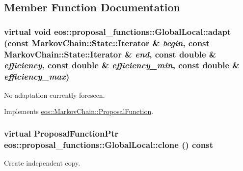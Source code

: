 \subsection{Member Function Documentation}
\hypertarget{classeos_1_1proposal__functions_1_1GlobalLocal_aecea521f102e4f3c2fd0fad24b21b730}{
\subsubsection[{adapt}]{\setlength{\rightskip}{0pt plus 5cm}virtual void eos::proposal\_\-functions::GlobalLocal::adapt (const {\bf MarkovChain::State::Iterator} \& {\em begin}, \/  const {\bf MarkovChain::State::Iterator} \& {\em end}, \/  const double \& {\em efficiency}, \/  const double \& {\em efficiency\_\-min}, \/  const double \& {\em efficiency\_\-max})}}
\label{classeos_1_1proposal__functions_1_1GlobalLocal_aecea521f102e4f3c2fd0fad24b21b730}


No adaptation currently foreseen. 

Implements \hyperlink{structeos_1_1MarkovChain_1_1ProposalFunction_afee6a937c53b9cfb257a5cd724a54296}{eos::MarkovChain::ProposalFunction}.\hypertarget{classeos_1_1proposal__functions_1_1GlobalLocal_ae0ee0bd2127085ceacb1a89f5527515b}{
\subsubsection[{clone}]{\setlength{\rightskip}{0pt plus 5cm}virtual {\bf ProposalFunctionPtr} eos::proposal\_\-functions::GlobalLocal::clone () const}}
\label{classeos_1_1proposal__functions_1_1GlobalLocal_ae0ee0bd2127085ceacb1a89f5527515b}


Create independent copy. 

